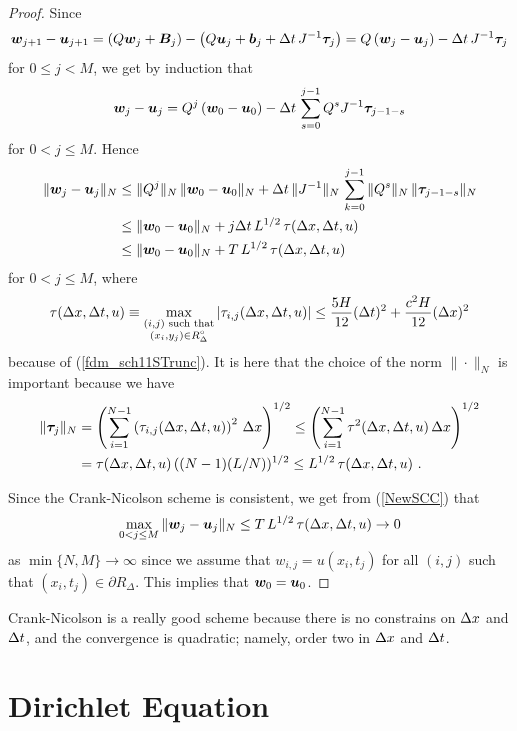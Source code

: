 \begin{proof}
Since
\[
  \bm{w}_{j+1} - \bm{u}_{j+1}
=  \left( Q\bm{w}_j + \bm{B}_j \right)
- \left( Q \bm{u}_j + \bm{b}_j + \Delta{t}\,J^{-1} \bm{\tau}_j \right)
=  Q\left( \bm{w}_j - \bm{u}_j\right) - \Delta{t}\, J^{-1} \bm{\tau}_j
\]
for $0\leq j < M$, we get by induction that
\[
\bm{w}_j - \bm{u}_j
= Q^j\left( \bm{w}_0 - \bm{u}_0\right) -
\Delta{t}\, \sum_{s=0}^{j-1} Q^s J^{-1} \bm{\tau}_{j-1-s}
\]
for $0 < j \leq M$.  Hence
\begin{align}
\| \bm{w}_j - \bm{u}_j \|_N
&\leq \|Q^j\|_N\,\|\bm{w}_0 - \bm{u}_0\|_N
+ \Delta{t}\, \|J^{-1}\|_N \, \sum_{k=0}^{j-1} \|Q^s\|_N\, \|\bm{\tau}_{j-1-s}\|_N
\nonumber \\
& \leq \|\bm{w}_0 - \bm{u}_0\|_N
  + j \Delta{t} \, L^{1/2} \,\tau(\Delta{x},\Delta{t},u) \nonumber \\
&\leq \|\bm{w}_0 - \bm{u}_0\|_N
  + T \, L^{1/2} \,\tau(\Delta{x},\Delta{t},u) \label{NewSCC}
\end{align}
for $0 < j \leq M$, where
\[
\tau(\Delta{x},\Delta{t},u) \equiv
\max_{\substack{(i,j) \text{ such that}\\(x_i,y_j) \in R^\circ_\Delta}}
|\tau_{i,j}(\Delta{x},\Delta{t},u)|
\leq \frac{5H}{12} (\Delta{t})^2 + \frac{c^2 H}{12} (\Delta{x})^2
\]
because of (\ref{fdm_sch11STrunc}).  It is here that the choice of the
norm $\|\cdot\|_N$ is important because we have
\begin{align*}
\|\bm{\tau}_j\|_N 
&= \left(\sum_{i=1}^{N-1} \left(\tau_{i,j}(\Delta{x},\Delta{t},u)\right)^2\,
\Delta{x}\right)^{1/2}
\leq \left(\sum_{i=1}^{N-1} \tau^2(\Delta{x},\Delta{t},u)\,\Delta{x}\right)^{1/2} \\
&= \tau(\Delta{x},\Delta{t},u) \,
((N-1)(L/N))^{1/2} \leq L^{1/2}\, \tau(\Delta{x},\Delta{t},u) \ .
\end{align*}

Since the Crank-Nicolson scheme is consistent, we get from
(\ref{NewSCC}) that
\[
\max_{0<j\leq M} \| \bm{w}_j - \bm{u}_j \|_N
\leq T \, L^{1/2} \,\tau(\Delta{x},\Delta{t},u) \to 0
\]
as $\min\{N,M\} \to \infty$ since we assume that
$w_{i,j} = u(x_i,t_j)$ for all $(i,j)$ such that
$(x_i,t_j) \in \partial R_\Delta$.  This implies that
$\bm{w}_0 = \bm{u}_0$.
\end{proof}

Crank-Nicolson is a really good scheme because there is no constrains
on $\Delta{x}$ and $\Delta{t}$, and the convergence is quadratic; namely,
order two in $\Delta{x}$ and $\Delta{t}$.

\section{Dirichlet Equation} \label{CCSDirichlet}

